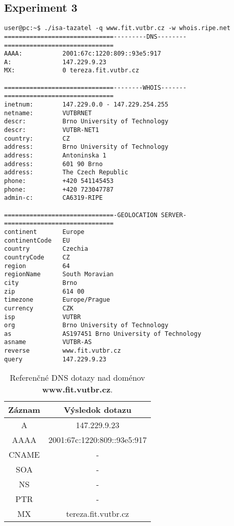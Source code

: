 \documentclass[a4paper, 11pt]{article}
\begin{document}
\subsection{Experiment 3}\label{experiment_3}
\begin{lstlisting}[caption={Výsledok dotazu nad doménov \textbf{www.fit.vutbr.cz}.},captionpos=b, label={test_app_3}]
user@pc:~$ ./isa-tazatel -q www.fit.vutbr.cz -w whois.ripe.net
==============================---------DNS--------==============================
AAAA:           2001:67c:1220:809::93e5:917
A:              147.229.9.23
MX:             0 tereza.fit.vutbr.cz

==============================--------WHOIS-------==============================
inetnum:        147.229.0.0 - 147.229.254.255
netname:        VUTBRNET
descr:          Brno University of Technology
descr:          VUTBR-NET1
country:        CZ
address:        Brno University of Technology
address:        Antoninska 1
address:        601 90 Brno
address:        The Czech Republic
phone:          +420 541145453
phone:          +420 723047787
admin-c:        CA6319-RIPE

==============================-GEOLOCATION SERVER-==============================
continent       Europe
continentCode   EU
country         Czechia
countryCode     CZ
region          64
regionName      South Moravian
city            Brno
zip             614 00
timezone        Europe/Prague
currency        CZK
isp             VUTBR
org             Brno University of Technology
as              AS197451 Brno University of Technology
asname          VUTBR-AS
reverse         www.fit.vutbr.cz
query           147.229.9.23
\end{lstlisting}


\begin{table}[h]
	\label{dns_refer_3}
	\centering
	\begin{tabular}{|c|c|}
		\hline
		\textbf{Záznam} & \textbf{Výsledok dotazu} \\ \hline
		A & 147.229.9.23 \\ \hline
		AAAA & 2001:67c:1220:809::93e5:917 \\ \hline
		CNAME & - \\ \hline
		SOA & - \\ \hline
		NS & - \\ \hline
		PTR & - \\ \hline
		MX & tereza.fit.vutbr.cz\\ \hline
	\end{tabular}
	\caption{Referenčné DNS dotazy nad doménov \textbf{www.fit.vutbr.cz}.}
\end{table}
\end{document}

